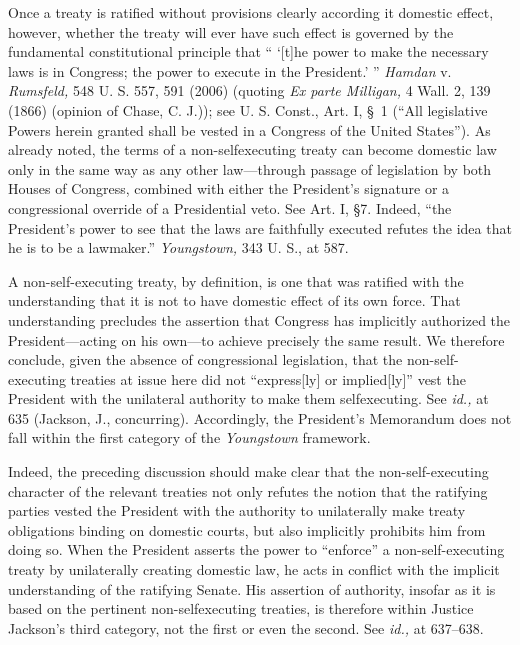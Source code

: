 {  Once a treaty is ratified without provisions clearly according it
domestic effect, however, whether the treaty will ever have such effect
is governed by the fundamental constitutional principle that ``
‘[t]he power to make the necessary laws is in Congress; the power to
execute in the President.' '' \emph{Hamdan} v. \emph{Rumsfeld,} 548 U. S.
557, 591 (2006) (quoting \emph{Ex parte Milligan,} 4 Wall. 2, 139 (1866)
(opinion of Chase, C. J.)); see U. S. Const., Art. I, \S~1 (``All
legislative Powers herein granted shall be vested in a Congress of the
United States''). As already noted, the terms of a non-selfexecuting
treaty can become domestic law only in the same way as any other
law---through passage of legislation by both Houses of Congress,
combined with either the President's signature or a congressional
override of a Presidential veto. See Art. I, \S7. Indeed, ``the
President's power to see that \newpage  the laws are faithfully executed
refutes the idea that he is to be a lawmaker.'' \emph{Youngstown,} 343
U. S., at 587.

  A non-self-executing treaty, by definition, is one that was ratified
with the understanding that it is not to have domestic effect of its
own force. That understanding precludes the assertion that Congress has
implicitly authorized the President---acting on his own---to achieve
precisely the same result. We therefore conclude, given the absence of
congressional legislation, that the non-self-executing treaties at issue
here did not ``express[ly] or implied[ly]'' vest the President with
the unilateral authority to make them selfexecuting. See \emph{id.,}
at 635 (Jackson, J., concurring). Accordingly, the President's
Memorandum does not fall within the first category of the \emph{Youngstown}
framework.

  Indeed, the preceding discussion should make clear that the
non-self-executing character of the relevant treaties not only refutes
the notion that the ratifying parties vested the President with the
authority to unilaterally make treaty obligations binding on domestic
courts, but also implicitly prohibits him from doing so. When the
President asserts the power to ``enforce'' a non-self-executing
treaty by unilaterally creating domestic law, he acts in conflict with
the implicit understanding of the ratifying Senate. His assertion of
authority, insofar as it is based on the pertinent non-selfexecuting
treaties, is therefore within Justice Jackson's third category, not
the first or even the second. See \emph{id.,} at 637--638.

}
